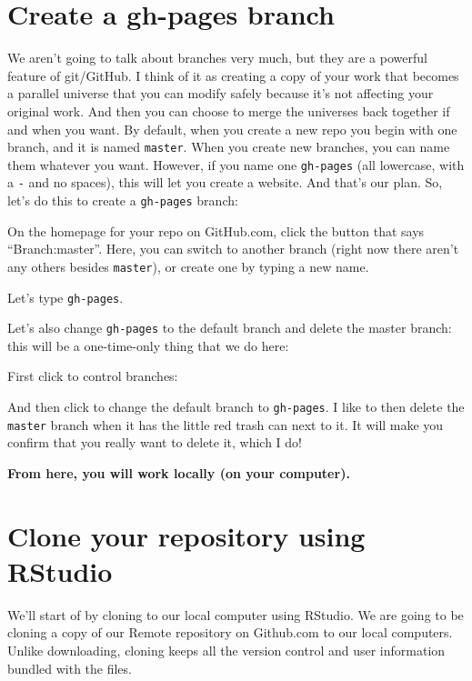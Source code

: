 \documentclass[]{book}
\begin{document}
\hypertarget{create-a-gh-pages-branch}{%
\section{Create a gh-pages branch}\label{create-a-gh-pages-branch}}

We aren't going to talk about branches very much, but they are a powerful feature of git/GitHub. I think of it as creating a copy of your work that becomes a parallel universe that you can modify safely because it's not affecting your original work. And then you can choose to merge the universes back together if and when you want. By default, when you create a new repo you begin with one branch, and it is named \texttt{master}. When you create new branches, you can name them whatever you want. However, if you name one \texttt{gh-pages} (all lowercase, with a \texttt{-} and no spaces), this will let you create a website. And that's our plan. So, let's do this to create a \texttt{gh-pages} branch:

On the homepage for your repo on GitHub.com, click the button that says ``Branch:master''. Here, you can switch to another branch (right now there aren't any others besides \texttt{master}), or create one by typing a new name.

Let's type \texttt{gh-pages}.

Let's also change \texttt{gh-pages} to the default branch and delete the master branch: this will be a one-time-only thing that we do here:

First click to control branches:

And then click to change the default branch to \texttt{gh-pages}. I like to then delete the \texttt{master} branch when it has the little red trash can next to it. It will make you confirm that you really want to delete it, which I do!

\textbf{From here, you will work locally (on your computer).}

\hypertarget{clone-your-repository-using-rstudio}{%
\section{Clone your repository using RStudio}\label{clone-your-repository-using-rstudio}}

We'll start of by cloning to our local computer using RStudio. We are going to be cloning a copy of our Remote repository on Github.com to our local computers. Unlike downloading, cloning keeps all the version control and user information bundled with the files.
\end{document}
